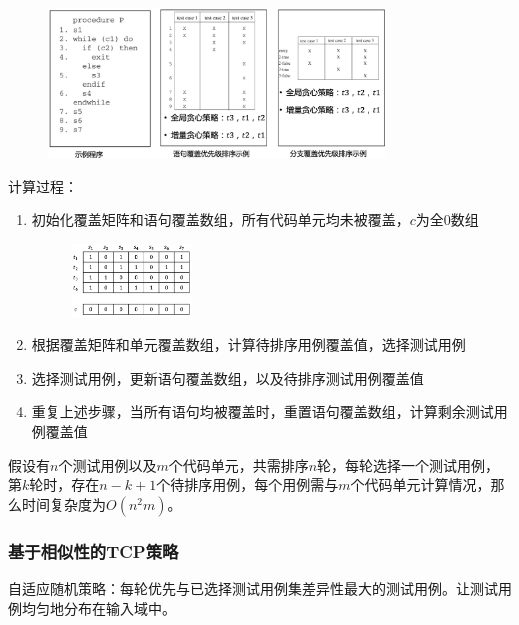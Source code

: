 \begin{figure}[H]
    \vspace{-0.5em}
	\centering
	\includegraphics[width=0.8\textwidth]{images/基于贪心的TCP策略.png}
    \vspace{-1em}
\end{figure}

计算过程：
\begin{enumerate}[label=\arabic*.]
    \item 初始化覆盖矩阵和语句覆盖数组，所有代码单元均未被覆盖，$c$为全0数组
    \begin{figure}[H]
        \vspace{-0.5em}
        \centering
        \includegraphics[width=0.3\textwidth]{images/基于贪心的TCP策略计算过程.png}
        \vspace{-1em}
    \end{figure}
    \item 根据覆盖矩阵和单元覆盖数组，计算待排序用例覆盖值，选择测试用例
    \item 选择测试用例，更新语句覆盖数组，以及待排序测试用例覆盖值
    \item 重复上述步骤，当所有语句均被覆盖时，重置语句覆盖数组，计算剩余测试用例覆盖值
\end{enumerate}

假设有$n$个测试用例以及$m$个代码单元，共需排序$n$轮，每轮选择一个测试用例，第$k$轮时，存在$n-k+1$个待排序用例，每个用例需与$m$个代码单元计算情况，那么时间复杂度为$O(n^2m)$。

\subsubsection{基于相似性的TCP策略}
自适应随机策略：每轮优先与已选择测试用例集差异性最大的测试用例。让测试用例均匀地分布在输入域中。

